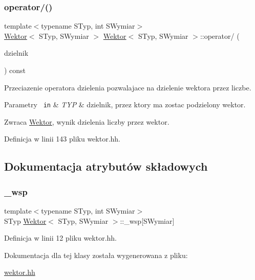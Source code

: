 \mbox{\label{class_wektor_a76e4de69098c509ae0da392c218b9270}} 
\subsubsection{\texorpdfstring{operator/()}{operator/()}}
{\footnotesize\ttfamily template$<$typename S\+Typ, int S\+Wymiar$>$ \\
\mbox{\hyperlink{class_wektor}{Wektor}}$<$ S\+Typ, S\+Wymiar $>$ \mbox{\hyperlink{class_wektor}{Wektor}}$<$ S\+Typ, S\+Wymiar $>$\+::operator/ (\begin{DoxyParamCaption}\item[{S\+Typ const \&}]{dzielnik }\end{DoxyParamCaption}) const}

Przeciazenie operatora dzielenia pozwalajace na dzielenie wektora przez liczbe.


\begin{DoxyParams}[1]{Parametry}
\mbox{\texttt{ in}}  & {\em T\+YP} & dzielnik, przez ktory ma zostac podzielony wektor. \\
\hline
\end{DoxyParams}
\begin{DoxyReturn}{Zwraca}
\mbox{\hyperlink{class_wektor}{Wektor}}, wynik dzielenia liczby przez wektor. 
\end{DoxyReturn}


Definicja w linii 143 pliku wektor.\+hh.



\subsection{Dokumentacja atrybutów składowych}
\mbox{\label{class_wektor_a3ee1d2902419ae77e615280d7a62161b}} 
\subsubsection{\texorpdfstring{\_wsp}{\_wsp}}
{\footnotesize\ttfamily template$<$typename S\+Typ, int S\+Wymiar$>$ \\
S\+Typ \mbox{\hyperlink{class_wektor}{Wektor}}$<$ S\+Typ, S\+Wymiar $>$\+::\+\_\+wsp\mbox{[}S\+Wymiar\mbox{]}\hspace{0.3cm}{\ttfamily [private]}}



Definicja w linii 12 pliku wektor.\+hh.



Dokumentacja dla tej klasy została wygenerowana z pliku\+:\begin{DoxyCompactItemize}
\item 
\mbox{\hyperlink{wektor_8hh}{wektor.\+hh}}\end{DoxyCompactItemize}
